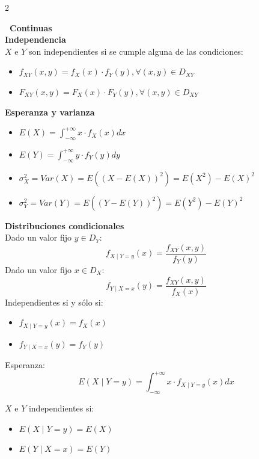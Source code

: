 \documentclass[10pt,a4paper]{article}
\begin{document}
\begin{tcolorbox}[title=Distribuciones Marginales]
\begin{multicols}{2}
        \columnbreak

        {\large\bfseries\ Continuas}\\
        \textbf{Independencia} \\
        $X$ e $Y$ son independientes si se cumple alguna de las condiciones:
        \begin{itemize}
            \item $f_{XY}(x, y) = f_X(x) \cdot f_Y(y), \forall (x, y) \in D_{XY}$
            \item $F_{XY}(x, y) = F_X(x) \cdot F_Y(y), \forall (x, y) \in D_{XY}$
        \end{itemize}

        \textbf{Esperanza y varianza} \\
        \begin{itemize}
            \item $E(X) = \int_{-\infty}^{+\infty} x \cdot f_X(x)dx$
            \item $E(Y) = \int_{-\infty}^{+\infty} y \cdot f_Y(y)dy$
            \item $\sigma_X^2 = Var(X) = E((X - E(X))^2) = E(X^2) - E(X)^2$
            \item $\sigma_Y^2 = Var(Y) = E((Y - E(Y))^2) = E(Y^2) - E(Y)^2$
        \end{itemize}

        \textbf{Distribuciones condicionales} \\
        Dado un valor fijo $y \in D_Y$:
        \[
            f_{X \mid Y=y}(x) = \frac{f_{XY}(x, y)}{f_Y(y)}
        \]
        Dado un valor fijo $x \in D_X$:
        \[
            f_{Y \mid X=x}(y) = \frac{f_{XY}(x, y)}{f_X(x)}
        \]
        Independientes si y sólo si:
        \begin{itemize}
            \item $f_{X \mid Y=y}(x) = f_X(x)$
            \item $f_{Y \mid X=x}(y) = f_Y(y)$
        \end{itemize}
        Esperanza:
        \[
            E(X \mid Y=y) = \int_{-\infty}^{+\infty} x \cdot f_{X \mid Y=y}(x)dx
        \]
    \end{multicols}
    $X$ e $Y$ independientes si:
    \begin{itemize}
        \item $E(X \mid Y = y) = E(X)$
        \item $E(Y \mid X = x) = E(Y)$
    \end{itemize}
\end{tcolorbox}
\end{document}
